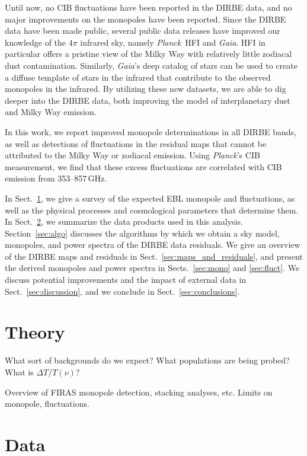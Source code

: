 \documentclass{aa}
\def\Planck{\textit{Planck}}
\begin{document}
Until now, no CIB fluctuations have been reported in the DIRBE data, and no major improvements on the monopoles have been reported. Since the DIRBE data have been made public, several public data releases have improved our knowledge of the $4\pi$ infrared sky, namely \Planck\ HFI and \textit{Gaia}. HFI in particular offers a pristine view of the Milky Way with relatively little zodiacal dust contamination. Similarly, \textit{Gaia}'s deep catalog of stars can be used to create a diffuse template of stars in the infrared that contribute to the observed monopoles in the infrared. By utilizing these new datasets, we are able to dig deeper into the DIRBE data, both improving the model of interplanetary dust and Milky Way emission.

In this work, we report improved monopole determinations in all DIRBE bands, as well as detections of fluctuations in the residual maps that cannot be attributed to the Milky Way or zodiacal emission. Using \Planck's CIB measurement, we find that these excess fluctuations are correlated with CIB emission from 353--857\,GHz.

In Sect.~\ref{sec:theory}, we give a survey of the expected EBL monopole and fluctuations, as well as the physical processes and cosmological parameters that determine them. In Sect.~\ref{sec:data}, we summarize the data products used in this analysis. Section~\ref{sec:algo} discusses the algorithms by which we obtain a sky model, monopoles, and power spectra of the DIRBE data residuals. We give an overview of the DIRBE maps and residuals in Sect.~\ref{sec:maps_and_residuals}, and present the derived monopoles and power spectra in Sects.~\ref{sec:mono} and \ref{sec:fluct}. We discuss potential improvements and the impact of external data in Sect.~\ref{sec:discussion}, and we conclude in Sect.~\ref{sec:conclusions}.


\section{Theory}
\label{sec:theory}

What sort of backgrounds do we expect? What populations are being probed? What is $\Delta T/T(\nu)$?

Overview of FIRAS monopole detection, stacking analyses, etc. Limits on monopole, fluctuations.

\section{Data}
\label{sec:data}
\end{document}

